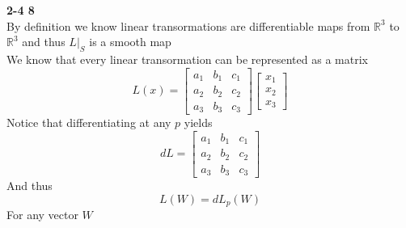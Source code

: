 \documentclass[12pt]{article}
\newenvironment{ques}[1]{\textbf{#1}\vspace{1 mm}\\ }{\bigskip}
\theoremstyle{definition}
\newcommand{\R}{\mathbb R}
\begin{document}
\begin{ques}{2-4 8}
	By definition we know linear transormations are differentiable maps from
	$\R^3$ to $\R^3$ and thus $L|_S$ is a smooth map\\
	We know that every linear transormation can be represented as a matrix
	$$
	L(x) = 
	\begin{bmatrix}
	a_1 & b_1 & c_1\\
	a_2 & b_2 & c_2\\
	a_3 & b_3 & c_3
	\end{bmatrix}
	\begin{bmatrix}
	x_1 \\
	x_2 \\
	x_3
	\end{bmatrix}
	$$
	Notice that differentiating at any $p$ yields
	$$
	dL = 
	\begin{bmatrix}
	a_1 & b_1 & c_1\\
	a_2 & b_2 & c_2\\
	a_3 & b_3 & c_3
	\end{bmatrix}
	$$
	And thus 
	$$L(W) = dL_p(W)$$
	For any vector $W$
\end{ques}
\end{document}
